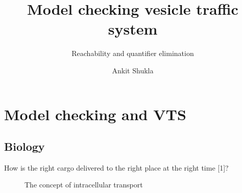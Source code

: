 \documentclass{beamer}
\title{Model checking vesicle traffic system} %
\subtitle{Reachability and quantifier elimination} %
\author{Ankit Shukla}
\begin{document}
  \frame{\maketitle}


    \section{Model checking and VTS}
    \subsection{Biology}
 

    \begin{frame}[label=lists]{How is the right cargo delivered to the
right place at the right time [1]? }
      \bigskip
      \justifying

 
\begin{figure}
\caption{The concept of intracellular transport}
\label{some example}
\end{figure}
   \end{frame}
\end{document}
